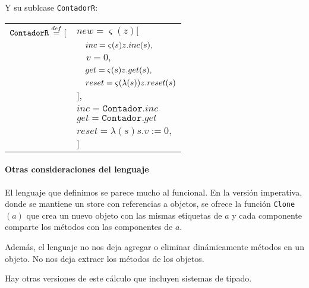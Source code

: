 Y su sublcase \texttt{ContadorR}:

\vspace*{5mm}
\begin{tabular}{ll}
$\texttt{ContadorR}\overset{def}{=} [$ &
$new = \varsigma(z)[$
\\ & $\quad inc = \varsigma(s)z.inc(s),$ \\ 
 & $\quad v = 0,$ \\
 & $\quad get = \varsigma(s)z.get(s),$ \\
 & $\quad reset = \varsigma(\lambda(s))z.reset(s) $ \\
 & $ ],$ \\
& $inc = \texttt{Contador}.inc$ \\
& $get = \texttt{Contador}.get$ \\
& $reset = \lambda(s) s.v := 0,$ \\
& $]$ \\
\end{tabular}


\paragraph{Otras consideraciones del lenguaje}
El lenguaje que definimos se parece mucho al funcional. En la versión imperativa, donde se mantiene un store con referencias a objetos, se ofrece la función \texttt{Clone}$(a)$ que crea un nuevo objeto con las mismas etiquetas de $a$ y cada componente comparte los métodos con las componentes de $a$.

Además, el lenguaje no nos deja agregar o eliminar dinámicamente métodos en un objeto. No nos deja extraer los métodos de los objetos.

Hay otras versiones de este cálculo que incluyen sistemas de tipado.